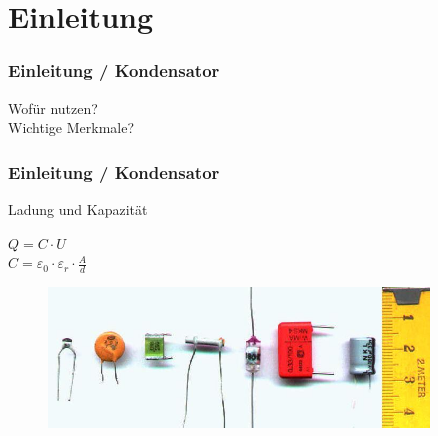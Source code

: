 

\subtitle{Technik Klasse A 03: \\
  Kondensator, Spule, Transformator \\[2em]}
\date{Stand 16.01.2017}


\section*{Einleitung}

\begin{frame}
  \frametitle{Einleitung / Kondensator}
  \begin{center}
    \Large{Wofür nutzen?}\\
    \Large{Wichtige Merkmale?}
  \end{center}
\end{frame}

\begin{frame}
  \frametitle{Einleitung / Kondensator}
  \begin{block}{Ladung und Kapazität}
    \begin{center}
      \Large{$Q = C \cdot U$}\\
      \Large{$C= \varepsilon_{0} \cdot \varepsilon_{r} \cdot \frac{A}{d}$}
    \end{center}
  \end{block}
  \begin{center}
    \begin{figure}
      \includegraphics[width=0.9\textwidth,height=0.5\textheight,keepaspectratio]{e05/Kondensator02.jpg}
    \end{figure}
  \end{center}
\end{frame}


